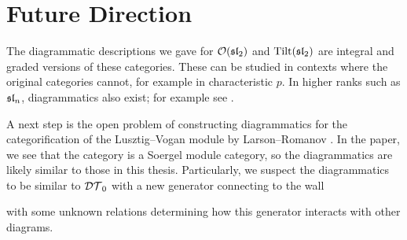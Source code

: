\chapter{Future Direction}
\label{chapter:future-direction}

The diagrammatic descriptions we gave for $\mathcal{O}(\operatorname{\mathfrak{sl}}_2)$ and $\operatorname{Tilt}(\operatorname{\mathfrak{sl}}_2)$ are integral and graded versions of these categories. These can be studied in contexts where the original categories cannot, for example in characteristic $p$. In higher ranks such as $\operatorname{\mathfrak{sl}}_n$, diagrammatics also exist; for example see \cite{riche-williamson-tilt-modules-p-canon-basis}.

A next step is the open problem of constructing diagrammatics for the categorification of the Lusztig--Vogan module by Larson--Romanov \cite{categorification-lusztig-vogan-module}. In the paper, we see that the category is a Soergel module category, so the diagrammatics are likely similar to those in this thesis. Particularly, we suspect the diagrammatics to be similar to $\mathcal{DT}_0$ with a new generator connecting to the wall
\begin{center}
\end{center}
with some unknown relations determining how this generator interacts with other diagrams.

